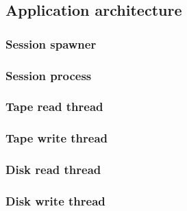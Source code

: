 \subsection{Application architecture}

\subsubsection{Session spawner}

\subsubsection{Session process}

\subsubsection{Tape read thread}

\subsubsection{Tape write thread}

\subsubsection{Disk read thread}

\subsubsection{Disk write thread}


